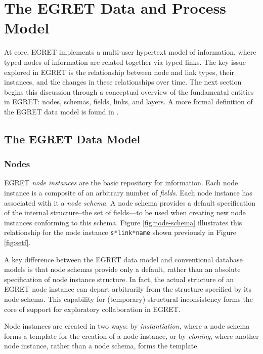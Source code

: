 \section{The EGRET Data and Process Model}

At core, EGRET implements a multi-user hypertext model of information, where typed nodes of information are related together via typed links.  The key issue explored in EGRET is the relationship between node and link types, their instances, and the changes in these relationships over time.  The next section begins this discussion through a conceptual overview of the fundamental entities in EGRET: nodes, schemas, fields, links, and layers. A more formal definition of the EGRET data model is found in \cite{csdl-91-02}.

\subsection{The EGRET Data Model}

\subsubsection{Nodes}

EGRET {\em node instances}\/ are the basic repository for information.  Each node instance is a composite of an arbitrary number of {\em fields}.  Each node instance has associated with it a {\em node schema}.  A node schema provides a default specification of the internal structure--the set of fields---to be used when creating new node instances conforming to this schema.  Figure \ref{fig:node-schema} illustrates this relationship for the node instance {\tt s*link*name} shown previously in Figure \ref{fig:setf}.


A key difference between the EGRET data model and conventional database models is that node schemas provide only a default, rather than an absolute specification of node instance structure.  In fact, the actual structure of an EGRET node instance can depart arbitrarily from the structure specified by its node schema. This capability for (temporary) structural inconsistency forms the core of support for exploratory collaboration in EGRET.

Node instances are created in two ways: by {\em instantiation}, where a node schema forms a template for the creation of a node instance, or by {\em cloning}, where another node instance, rather than a node schema, forms the template.

